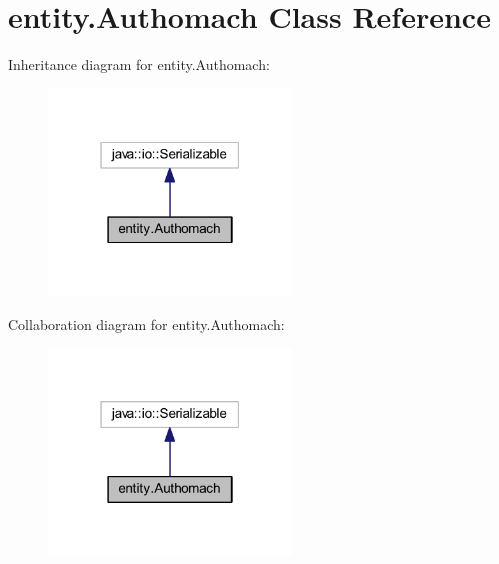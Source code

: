 \hypertarget{classentity_1_1_authomach}{}\section{entity.\+Authomach Class Reference}
\label{classentity_1_1_authomach}


Inheritance diagram for entity.\+Authomach\+:\nopagebreak
\begin{figure}[H]
\begin{center}
\leavevmode
\includegraphics[width=183pt]{classentity_1_1_authomach__inherit__graph}
\end{center}
\end{figure}


Collaboration diagram for entity.\+Authomach\+:\nopagebreak
\begin{figure}[H]
\begin{center}
\leavevmode
\includegraphics[width=183pt]{classentity_1_1_authomach__coll__graph}
\end{center}
\end{figure}
